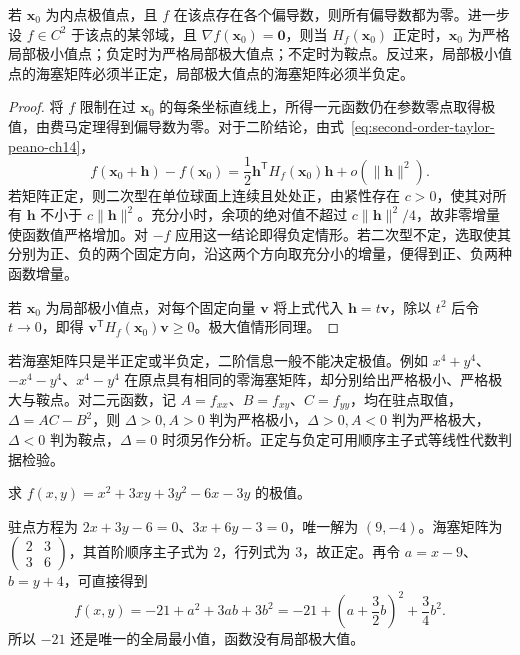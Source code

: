 \documentclass[UTF8,12pt,a4paper,fontset=fandol]{ctexbook}
\begin{document}
\begin{theorem}[极值的必要条件与二阶判别]
\label{thm:multivariable-extremum-tests-ch14}
若 $\boldsymbol x_0$ 为内点极值点，且 $f$ 在该点存在各个偏导数，则所有偏导数都为零。进一步设 $f\in C^2$ 于该点的某邻域，且 $\nabla f(\boldsymbol x_0)=\boldsymbol0$，则当 $H_f(\boldsymbol x_0)$ 正定时，$\boldsymbol x_0$ 为严格局部极小值点；负定时为严格局部极大值点；不定时为鞍点。反过来，局部极小值点的海塞矩阵必须半正定，局部极大值点的海塞矩阵必须半负定。
\end{theorem}
\begin{proof}
将 $f$ 限制在过 $\boldsymbol x_0$ 的每条坐标直线上，所得一元函数仍在参数零点取得极值，由费马定理得到偏导数为零。对于二阶结论，由式~\eqref{eq:second-order-taylor-peano-ch14}，
\[
    f(\boldsymbol x_0+\boldsymbol h)-f(\boldsymbol x_0)
    =\frac12\boldsymbol h^{\mathsf T}H_f(\boldsymbol x_0)\boldsymbol h
       +o(\|\boldsymbol h\|^2).
\]
若矩阵正定，则二次型在单位球面上连续且处处正，由紧性存在 $c>0$，使其对所有 $\boldsymbol h$ 不小于 $c\|\boldsymbol h\|^2$。充分小时，余项的绝对值不超过 $c\|\boldsymbol h\|^2/4$，故非零增量使函数值严格增加。对 $-f$ 应用这一结论即得负定情形。若二次型不定，选取使其分别为正、负的两个固定方向，沿这两个方向取充分小的增量，便得到正、负两种函数增量。

若 $\boldsymbol x_0$ 为局部极小值点，对每个固定向量 $\boldsymbol v$ 将上式代入 $\boldsymbol h=t\boldsymbol v$，除以 $t^2$ 后令 $t\to0$，即得 $\boldsymbol v^{\mathsf T}H_f(\boldsymbol x_0)\boldsymbol v\geq0$。极大值情形同理。
\end{proof}

若海塞矩阵只是半正定或半负定，二阶信息一般不能决定极值。例如 $x^4+y^4$、$-x^4-y^4$、$x^4-y^4$ 在原点具有相同的零海塞矩阵，却分别给出严格极小、严格极大与鞍点。对二元函数，记 $A=f_{xx}$、$B=f_{xy}$、$C=f_{yy}$，均在驻点取值，$\Delta=AC-B^2$，则 $\Delta>0,A>0$ 判为严格极小，$\Delta>0,A<0$ 判为严格极大，$\Delta<0$ 判为鞍点，$\Delta=0$ 时须另作分析。正定与负定可用顺序主子式等线性代数判据检验。

\begin{example}
\label{ex:quadratic-global-minimum-ch14}
求 $f(x,y)=x^2+3xy+3y^2-6x-3y$ 的极值。
\end{example}
\begin{solve}
驻点方程为 $2x+3y-6=0$、$3x+6y-3=0$，唯一解为 $(9,-4)$。海塞矩阵为 $\begin{pmatrix}2&3\\3&6\end{pmatrix}$，其首阶顺序主子式为 $2$，行列式为 $3$，故正定。再令 $a=x-9$、$b=y+4$，可直接得到
\[
    f(x,y)=-21+a^2+3ab+3b^2
       =-21+\left(a+\frac32b\right)^2+\frac34b^2.
\]
所以 $-21$ 还是唯一的全局最小值，函数没有局部极大值。
\end{solve}
\end{document}
